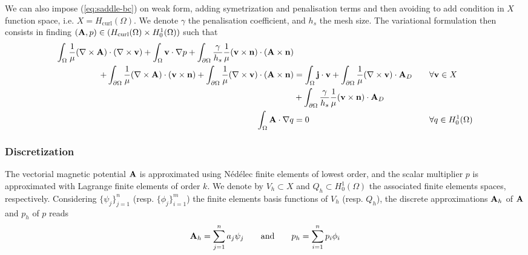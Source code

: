 We can also impose (\ref{eq:saddle-bc}) on weak form, adding symetrization and
penalisation terms and then avoiding to add condition in $X$ function space,
i.e. $X = H_{\mathrm{curl}}(\Omega)$. We denote $\gamma$ the penalisation
coefficient, and $h_s$ the mesh size. The variational formulation then consists
in finding $(\mathbf{A},p) \in ( H_{\mathrm{curl}}(\Omega) \times H^1_0(\Omega))$ such
that
\begin{alignat}{2}
  \int_{\Omega}\frac{1}{\mu}(\nabla \times \bA) \cdot (\nabla \times \bv)
  + \int_{\Omega} \bv \cdot \nabla p
  +\int_{\partial\Omega}\frac{\gamma}{h_s}\frac{1}{\mu}
  (\bv \times \bn) \cdot (\bA \times \bn)
  &&& \nonumber \\
  +\int_{\partial\Omega}\frac{1}{\mu}(\nabla\times\bA)\cdot(\bv\times\bn)
  +\int_{\partial\Omega}\frac{1}{\mu}(\nabla\times\bv)\cdot(\bA\times\bn)
  & = \int_{\Omega} \bj \cdot \bv
  + \int_{\partial \Omega}\frac{1}{\mu} (\nabla \times \bv) \cdot \bA_D
  &&\quad \forall \bv \in X \label{eq:vf-saddle-weak-1} \\
  &   + \int_{\partial\Omega}\frac{\gamma}{h_s}
  \frac{1}{\mu}(\bv\times\bn)\cdot \bA_D
  && \nonumber \\
  \int_{\Omega} \bA \cdot \nabla q &= 0
  &&\quad\forall q \in H^1_0(\Omega) \nonumber%
\end{alignat}

\subsubsection{Discretization}
The vectorial magnetic potential $\mathbf{A}$ is approximated using Nédélec finite
elements of lowest order, and the scalar multiplier $p$ is approximated with
Lagrange finite elements of order $k$. We denote by $V_h \subset X $ and
$Q_h \subset H^1_0(\Omega)$ the associated finite elements spaces, respectively.
Considering $\{ \psi_j \}_{j=1}^{n}$ (resp. $\{ \phi_j \}_{i=1}^{m}$) the finite
elements basis functions of $V_h$ (resp. $Q_h$), the discrete approximations
$\mathbf{A}_h$ of $\mathbf{A}$ and $p_h$ of $p$ reads
\begin{equation}
  \label{eq:saddle-discretization}
  \mathbf{A}_h = \sum \limits_{j=1}^{n} a_j \psi_j \qquad \text{and} \qquad p_h = \sum \limits_{i=1}^{n} p_i \phi_i
\end{equation}

